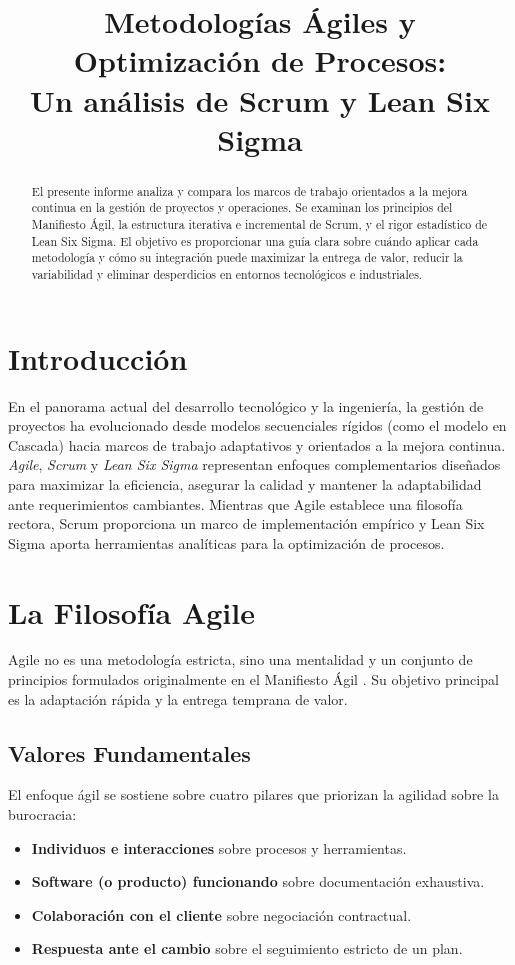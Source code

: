 \documentclass[12pt, a4paper]{article}
\title{\textbf{Metodologías Ágiles y Optimización de Procesos:}\\ \Large Un análisis de Scrum y Lean Six Sigma}
\author{}
\date{}
\begin{document}
\maketitle

\begin{abstract}
El presente informe analiza y compara los marcos de trabajo orientados a la mejora continua en la gestión de proyectos y operaciones. Se examinan los principios del Manifiesto Ágil, la estructura iterativa e incremental de Scrum, y el rigor estadístico de Lean Six Sigma. El objetivo es proporcionar una guía clara sobre cuándo aplicar cada metodología y cómo su integración puede maximizar la entrega de valor, reducir la variabilidad y eliminar desperdicios en entornos tecnológicos e industriales.
\end{abstract}

\tableofcontents
\newpage

\section{Introducción}
En el panorama actual del desarrollo tecnológico y la ingeniería, la gestión de proyectos ha evolucionado desde modelos secuenciales rígidos (como el modelo en Cascada) hacia marcos de trabajo adaptativos y orientados a la mejora continua. \textit{Agile}, \textit{Scrum} y \textit{Lean Six Sigma} representan enfoques complementarios diseñados para maximizar la eficiencia, asegurar la calidad y mantener la adaptabilidad ante requerimientos cambiantes. Mientras que Agile establece una filosofía rectora, Scrum proporciona un marco de implementación empírico y Lean Six Sigma aporta herramientas analíticas para la optimización de procesos.

\section{La Filosofía Agile}
Agile no es una metodología estricta, sino una mentalidad y un conjunto de principios formulados originalmente en el Manifiesto Ágil \cite{beck2001}. Su objetivo principal es la adaptación rápida y la entrega temprana de valor.

\subsection{Valores Fundamentales}
El enfoque ágil se sostiene sobre cuatro pilares que priorizan la agilidad sobre la burocracia:
\begin{itemize}[label=\textbullet]
    \item \textbf{Individuos e interacciones} sobre procesos y herramientas.
    \item \textbf{Software (o producto) funcionando} sobre documentación exhaustiva.
    \item \textbf{Colaboración con el cliente} sobre negociación contractual.
    \item \textbf{Respuesta ante el cambio} sobre el seguimiento estricto de un plan.
\end{itemize}
\end{document}

